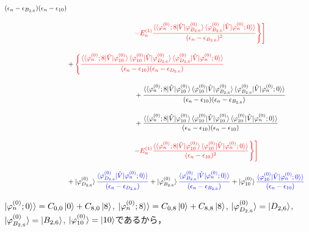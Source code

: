 \begin{align}
{    {(\epsilon_n-\epsilon_{B_{2,6}})(\epsilon_n-\epsilon_{10})}}\nn[10pt]
    &\hspace{100pt}
    \textcolor{red}{-E^{(1)}_n
    \frac{\langle\braket{\varphi^{(0)}_{n};8|\hat{V}|\varphi^{(0)}_{B_{2,6}}}
    \braket{\varphi^{(0)}_{B_{2,6}}|\hat{V}|\varphi^{(0)}_n;0}\rangle}{(\epsilon_n-\epsilon_{B_{2,6}})^2}
    \Biggr\}\Biggr]}
    \nn[10pt]
    &+\textcolor{red}{\Biggl\{
    \frac{\langle\braket{\varphi^{(0)}_{n};8|\hat{V}|\varphi^{(0)}_{10}}
    \langle{\varphi^{(0)}_{10}|\hat{V}|\varphi^{(0)}_{D_{2,6}}}\rangle
    \braket{\varphi^{(0)}_{D_{2,6}}|\hat{V}|\varphi^{(0)}_n;0}\rangle}
    {(\epsilon_n-\epsilon_{10})(\epsilon_n-\epsilon_{D_{2,6}})}}\nn[10pt]
    &\hspace{100pt}
    +{\frac{\langle\braket{\varphi^{(0)}_{n};8|\hat{V}|\varphi^{(0)}_{10}}
    \langle{\varphi^{(0)}_{10}|\hat{V}|\varphi^{(0)}_{B_{2,6}}}\rangle
    \braket{\varphi^{(0)}_{B_{2,6}}|\hat{V}|\varphi^{(0)}_n;0}\rangle}
    {(\epsilon_n-\epsilon_{10})(\epsilon_n-\epsilon_{B_{2,6}})}}\nn[10pt]
    &\hspace{100pt}
    +{\frac{\langle\braket{\varphi^{(0)}_{n};8|\hat{V}|\varphi^{(0)}_{10}}
    \langle{\varphi^{(0)}_{{10}}|\hat{V}|\varphi^{(0)}_{10}}\rangle
    \braket{\varphi^{(0)}_{10}|\hat{V}|\varphi^{(0)}_n;0}\rangle}
    {(\epsilon_n-\epsilon_{10})(\epsilon_n-\epsilon_{10})}}\nn[10pt]
    &\hspace{100pt}
    \textcolor{red}{-E^{(1)}_n
    \frac{\langle\braket{\varphi^{(0)}_{n};8|\hat{V}|\varphi^{(0)}_{10}}
    \braket{\varphi^{(0)}_{10}|\hat{V}|\varphi^{(0)}_n;0}\rangle}{(\epsilon_n-\epsilon_{10})^2}
    \Biggr\}\Biggr]}
    \nn[10pt]
    &+
    \ket{\varphi^{(0)}_{D_{2,6}}}
    \textcolor{blue}{
    \frac{\braket{\varphi^{(0)}_{D_{2,6}}|\hat{V}|\varphi^{(0)}_n;0}\rangle}{(\epsilon_n-\epsilon_{D_{2,6}})}}
    +
    \ket{\varphi^{(0)}_{B_{2,6}}}
    \textcolor{blue}{
    \frac{\braket{\varphi^{(0)}_{B_{2,6}}|\hat{V}|\varphi^{(0)}_n;0}\rangle}{(\epsilon_n-\epsilon_{B_{2,6}})}}
    +
    \ket{\varphi^{(0)}_{10}}
    \textcolor{blue}{
    \frac{\braket{\varphi^{(0)}_{10}|\hat{V}|\varphi^{(0)}_n;0}\rangle}{(\epsilon_n-\epsilon_{10})}}
\end{align}

$|\varphi^{(0)}_{n};0\rangle\rangle=C_{0,0}\ket{0}+C_{8,0}\ket{8}$, 
$|\varphi^{(0)}_{n};8\rangle\rangle=C_{0,8}\ket{0}+C_{8,8}\ket{8}$,  $|\varphi^{(0)}_{D_{2,6}}\rangle=\ket{D_{2,6}}$, $|\varphi^{(0)}_{B_{2,6}}\rangle=\ket{B_{2,6}}$, 
$|\varphi^{(0)}_{10}\rangle=\ket{10}$であるから，


